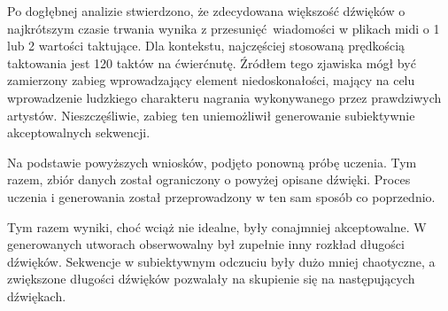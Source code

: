 {{        Po dogłębnej analizie stwierdzono, że zdecydowana większość dźwięków o najkrótszym czasie trwania
        wynika z przesunięć wiadomości w plikach midi o 1 lub 2 wartości taktujące. Dla kontekstu, najczęściej stosowaną
        prędkością taktowania jest 120 taktów na ćwierćnutę. Źródłem tego zjawiska mógł być zamierzony 
        zabieg wprowadzający element niedoskonałości, mający na celu wprowadzenie ludzkiego charakteru nagrania 
        wykonywanego przez prawdziwych artystów.
        Nieszczęśliwie, zabieg ten uniemożliwił generowanie subiektywnie akceptowalnych sekwencji.

        Na podstawie powyższych wniosków, podjęto ponowną próbę uczenia. Tym razem, zbiór danych został
        ograniczony o powyżej opisane dźwięki. Proces uczenia i generowania został przeprowadzony w ten sam sposób
        co poprzednio. 




        \bigskip

        Tym razem wyniki, choć wciąż nie idealne, były conajmniej akceptowalne. W generowanych utworach
        obserwowalny był zupełnie inny rozkład długości dźwięków. Sekwencje w subiektywnym odczuciu były dużo mniej
        chaotyczne, a zwiększone długości dźwięków pozwalały na skupienie się na następujących dźwiękach.
        
}}
